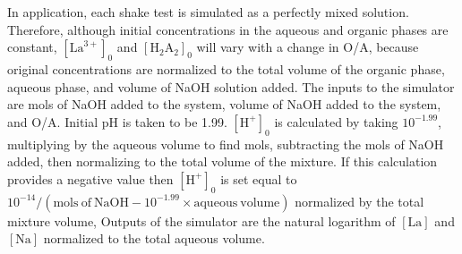 \documentclass[
]{article}
\begin{document}
In application, each shake test is simulated as a perfectly mixed solution. Therefore, although initial concentrations in the aqueous and organic phases are constant, \([\mathrm{La}^{3+}]_0\) and \([\mathrm{H_2A_2}]_0\) will vary with a change in O/A, because original concentrations are normalized to the total volume of the organic phase, aqueous phase, and volume of NaOH solution added. The inputs to the simulator are mols of NaOH added to the system, volume of NaOH added to the system, and O/A. Initial pH is taken to be 1.99. \([\mathrm{H}^+]_0\) is calculated by taking \(10^{-1.99}\), multiplying by the aqueous volume to find mols, subtracting the mols of NaOH added, then normalizing to the total volume of the mixture. If this calculation provides a negative value then \([\mathrm{H}^+]_0\) is set equal to \(10^{-14}/(\mathrm{mols \ of \ NaOH} - 10^{-1.99} \times \mathrm{aqueous \ volume})\) normalized by the total mixture volume, Outputs of the simulator are the natural logarithm of \([\mathrm{La}]\) and \([\mathrm{Na}]\) normalized to the total aqueous volume.
\end{document}
